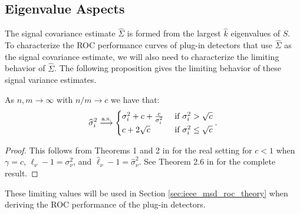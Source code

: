 \subsection{Eigenvalue Aspects}

The signal covariance estimate $\widehat{\Sigma}$ is formed from the largest $\widehat{k}$ eigenvalues of $S$. To characterize the ROC performance curves of plug-in detectors that use $\widehat{\Sigma}$ as the signal covariance estimate, we will also need to characterize the limiting behavior of $\widehat{\Sigma}$.  The following proposition gives the limiting behavior of these signal variance estimates.
\begin{prop}\label{th:eigvals_rmt}
As $n,m \longrightarrow \infty$ with $n/m \to c$ we have that:
\begin{equation*}
\widehat{\sigma}_i^2\overset{\textrm{a.s.}}{\longrightarrow}
\begin{cases}
 \sigma_i^2 + c + \frac{c}{\sigma_i^2} & \text{ if } \sigma_i^2 > \sqrt{c}\\
 c + 2\sqrt{c} & \text{ if } \sigma_i^2 \leq \sqrt{c}
\end{cases}.
\end{equation*}
\end{prop}
\begin{proof}
This follows from Theorems 1 and 2 in \cite{paul2007asymptotics} for the real setting for $c<1$ when $\gamma=c$, $\ell_\nu-1=\sigma_\nu^2$, and $\widehat{\ell}_\nu -1 = \widehat{\sigma}_\nu^2$. See Theorem 2.6 in \cite{benaych2011singular} for the complete result.
\end{proof}
These limiting values will be used in Section \ref{sec:ieee_msd_roc_theory} when deriving the ROC performance of the plug-in detectors.

